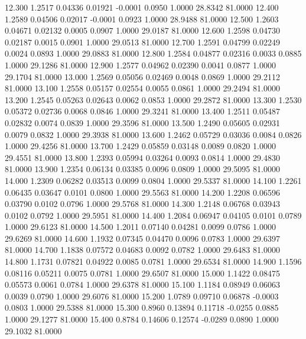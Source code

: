   12.300   1.2517   0.04336   0.01921  -0.0001   0.0950   1.0000  28.8342  81.0000
  12.400   1.2589   0.04506   0.02017  -0.0001   0.0923   1.0000  28.9488  81.0000
  12.500   1.2603   0.04671   0.02132   0.0005   0.0907   1.0000  29.0187  81.0000
  12.600   1.2598   0.04730   0.02187   0.0015   0.0901   1.0000  29.0513  81.0000
  12.700   1.2591   0.04799   0.02249   0.0024   0.0893   1.0000  29.0883  81.0000
  12.800   1.2584   0.04877   0.02316   0.0033   0.0885   1.0000  29.1286  81.0000
  12.900   1.2577   0.04962   0.02390   0.0041   0.0877   1.0000  29.1704  81.0000
  13.000   1.2569   0.05056   0.02469   0.0048   0.0869   1.0000  29.2112  81.0000
  13.100   1.2558   0.05157   0.02554   0.0055   0.0861   1.0000  29.2494  81.0000
  13.200   1.2545   0.05263   0.02643   0.0062   0.0853   1.0000  29.2872  81.0000
  13.300   1.2530   0.05372   0.02736   0.0068   0.0846   1.0000  29.3241  81.0000
  13.400   1.2511   0.05487   0.02832   0.0074   0.0839   1.0000  29.3596  81.0000
  13.500   1.2490   0.05605   0.02931   0.0079   0.0832   1.0000  29.3938  81.0000
  13.600   1.2462   0.05729   0.03036   0.0084   0.0826   1.0000  29.4256  81.0000
  13.700   1.2429   0.05859   0.03148   0.0089   0.0820   1.0000  29.4551  81.0000
  13.800   1.2393   0.05994   0.03264   0.0093   0.0814   1.0000  29.4830  81.0000
  13.900   1.2354   0.06134   0.03385   0.0096   0.0809   1.0000  29.5095  81.0000
  14.000   1.2309   0.06282   0.03513   0.0099   0.0804   1.0000  29.5337  81.0000
  14.100   1.2261   0.06435   0.03647   0.0101   0.0800   1.0000  29.5563  81.0000
  14.200   1.2208   0.06596   0.03790   0.0102   0.0796   1.0000  29.5768  81.0000
  14.300   1.2148   0.06768   0.03943   0.0102   0.0792   1.0000  29.5951  81.0000
  14.400   1.2084   0.06947   0.04105   0.0101   0.0789   1.0000  29.6123  81.0000
  14.500   1.2011   0.07140   0.04281   0.0099   0.0786   1.0000  29.6269  81.0000
  14.600   1.1932   0.07345   0.04470   0.0096   0.0783   1.0000  29.6397  81.0000
  14.700   1.1838   0.07572   0.04683   0.0092   0.0782   1.0000  29.6483  81.0000
  14.800   1.1731   0.07821   0.04922   0.0085   0.0781   1.0000  29.6534  81.0000
  14.900   1.1596   0.08116   0.05211   0.0075   0.0781   1.0000  29.6507  81.0000
  15.000   1.1422   0.08475   0.05573   0.0061   0.0784   1.0000  29.6378  81.0000
  15.100   1.1184   0.08949   0.06063   0.0039   0.0790   1.0000  29.6076  81.0000
  15.200   1.0789   0.09710   0.06878  -0.0003   0.0803   1.0000  29.5388  81.0000
  15.300   0.8960   0.13894   0.11718  -0.0255   0.0885   1.0000  29.1277  81.0000
  15.400   0.8784   0.14606   0.12574  -0.0289   0.0890   1.0000  29.1032  81.0000
